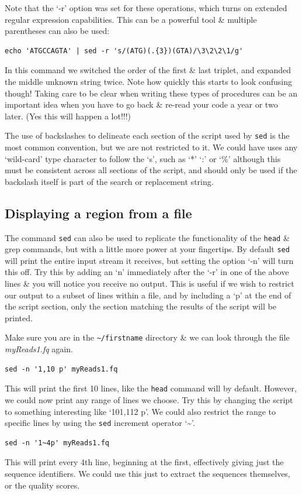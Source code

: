 \documentclass[a4paper,12pt,twoside]{memoir}
\begin{document}
\begin{steps}
Note that the `-r' option was set for these operations, which turns on extended regular expression capabilities.
This can be a powerful tool \& multiple parentheses can also be used: \\
\begin{lstlisting}
echo 'ATGCCAGTA' | sed -r 's/(ATG)(.{3})(GTA)/\3\2\2\1/g'
\end{lstlisting}
In this command we switched the order of the first \& last triplet, and expanded the middle unknown string twice.
Note how quickly this starts to look confusing though!
Taking care to be clear when writing these types of procedures can be an important idea when you have to go back \& re-read your code a year or two later.
(Yes this will happen a lot!!!)
\end{steps}

\begin{information}
The use of backslashes to delineate each section of the script used by \texttt{sed} is the most common convention, but we are not restricted to it.
We could have uses any `wild-card' type character to follow the `s', such as `*' `:' or `\%' although this must be consistent across all sections of the script, and should only be used if the backslash itself is part of the search or replacement string.
\end{information}

\subsection*{Displaying a region from a file}
The command \texttt{sed} can also be used to replicate the functionality of the \texttt{head} \& grep commands, but with a little more power at your fingertips.
By default \texttt{sed} will print the entire input stream it receives, but setting the option `-n' will turn this off.
Try this by adding an `n' immediately after the `-r' in one of the above lines \& you will notice you receive no output.
This is useful if we wish to restrict our output to a subset of lines within a file, and by including a `p' at the end of the script section, only the section matching the results of the script will be printed.
\begin{steps}
Make sure you are in the \texttt{\~{}/firstname} directory \& we can look through the file \textit{myReads1.fq} again.
\begin{lstlisting}
sed -n '1,10 p' myReads1.fq
\end{lstlisting}
This will print the first 10 lines, like the \texttt{head} command will by default.
However, we could now print any range of lines we choose.
Try this by changing the script to something interesting like `101,112 p'.
We could also restrict the range to specific lines by using the \texttt{sed} increment operator `\~{}'.
\begin{lstlisting}
sed -n '1~4p' myReads1.fq
\end{lstlisting}
This will print every 4th line, beginning at the first, effectively giving just the sequence identifiers.
We could use this just to extract the sequences themselves, or the quality scores.
\end{steps}
\end{document}
